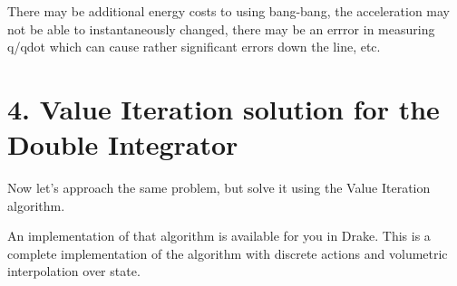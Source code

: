 \documentclass[11pt]{article}
\begin{document}
There may be additional energy costs to using bang-bang, the
acceleration may not be able to instantaneously changed, there may be an
errror in measuring q/qdot which can cause rather significant errors
down the line, etc.

    \section{4. Value Iteration solution for the Double
Integrator}\label{value-iteration-solution-for-the-double-integrator}

Now let's approach the same problem, but solve it using the Value
Iteration algorithm.

An implementation of that algorithm is available for you in Drake. This
is a complete implementation of the algorithm with discrete actions and
volumetric interpolation over state.
\end{document}
